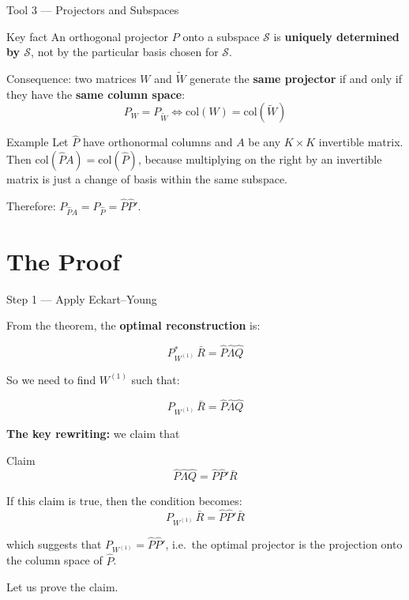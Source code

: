 \documentclass[aspectratio=169, 10pt]{beamer}
\newcommand{\Rbar}{\bar{R}}
\newcommand{\Phat}{\hat{P}}
\newcommand{\Lhat}{\hat{\Lambda}}
\newcommand{\Qhat}{\hat{Q}}
\newcommand{\Wone}{W^{(1)}}
\newcommand{\Pw}{P_{W^{(1)}}}
\begin{document}
\begin{frame}{Tool 3 — Projectors and Subspaces}

\begin{block}{Key fact}
An orthogonal projector $P$ onto a subspace $\mathcal{S}$ is \textbf{uniquely
determined by $\mathcal{S}$}, not by the particular basis chosen for $\mathcal{S}$.
\end{block}

\medskip
Consequence: two matrices $W$ and $\tilde{W}$ generate the \textbf{same projector}
if and only if they have the \textbf{same column space}:
$$P_W = P_{\tilde{W}} \iff \mathrm{col}(W) = \mathrm{col}(\tilde{W})$$

\medskip
\begin{exampleblock}{Example}
Let $\Phat$ have orthonormal columns and $A$ be any $K\times K$ invertible matrix.
Then $\mathrm{col}(\Phat A) = \mathrm{col}(\Phat)$, because multiplying on the right
by an invertible matrix is just a change of basis within the same subspace.

Therefore: $P_{\Phat A} = P_{\Phat} = \Phat\Phat'$.
\end{exampleblock}

\end{frame}

\section{The Proof}

\begin{frame}{Step 1 — Apply Eckart–Young}

From the theorem, the \textbf{optimal reconstruction} is:

$$P_{\Wone}^*\,\Rbar = \Phat\Lhat\Qhat$$

So we need to find $\Wone$ such that:

$$\Pw\,\Rbar = \Phat\Lhat\Qhat$$

\medskip
\textbf{The key rewriting:} we claim that

\begin{alertblock}{Claim}
$$\Phat\Lhat\Qhat = \Phat\Phat'\Rbar$$
\end{alertblock}

\medskip
If this claim is true, then the condition becomes:
$$\Pw\,\Rbar = \Phat\Phat'\Rbar$$

which suggests that $\Pw = \Phat\Phat'$, i.e.\ the optimal projector is the
projection onto the column space of $\Phat$.

\medskip
Let us prove the claim.

\end{frame}
\end{document}

